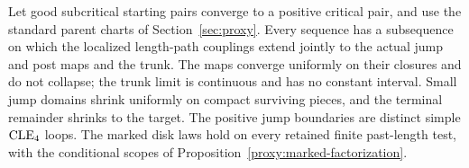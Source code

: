 \begin{lemma}
\label{cut:compact-geometric-limit}
Let good subcritical starting pairs converge to a positive critical pair,
and use the standard parent charts of Section~\ref{sec:proxy}.  Every
sequence has a subsequence on which the localized length-path couplings
extend jointly to the actual jump and post maps and the trunk.  The maps
converge uniformly on their closures and do not collapse; the trunk limit
is continuous and has no constant interval.  Small jump domains shrink
uniformly on compact surviving pieces, and the terminal remainder shrinks
to the target.  The positive jump boundaries are distinct simple
$\mathrm{CLE}_4$ loops.  The marked disk laws hold on every retained finite
past-length test, with the conditional scopes of
Proposition~\ref{proxy:marked-factorization}.
\end{lemma}
